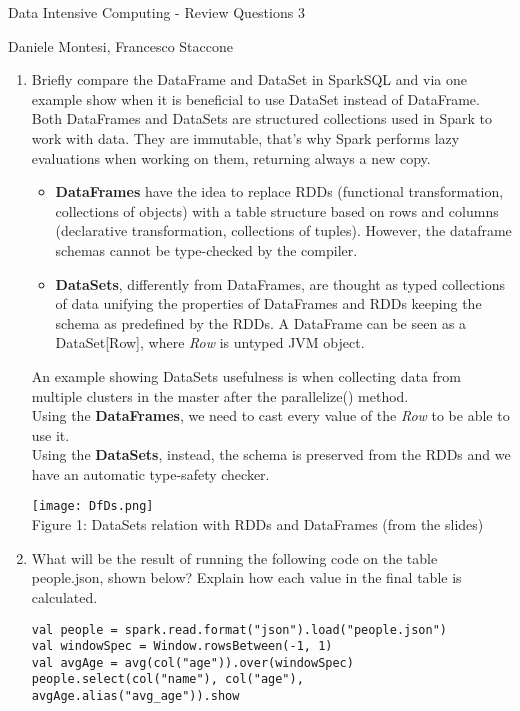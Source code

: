 \documentclass[]{report}
\begin{document}
\begin{center}
 {\Large Data Intensive Computing - Review Questions 3}
\end{center}
\begin{center}
 {\small Daniele Montesi, Francesco Staccone}
\end{center}
\vspace{1cm}
\justify
\begin{enumerate}
 \item Briefly compare the DataFrame and DataSet in SparkSQL and via one example show when it is beneficial to use DataSet instead of DataFrame.\\
 
\noindent Both DataFrames and DataSets are structured collections used in Spark to work with data. They are immutable, that's why Spark performs lazy evaluations when working on them, returning always a new copy.

\begin{itemize}
    \item \textbf{DataFrames} have the idea to replace RDDs (functional transformation, collections of objects) with a table structure based on rows and columns (declarative transformation, collections of tuples).
    However, the dataframe schemas cannot be type-checked by the compiler.
    \item \textbf{DataSets}, differently from DataFrames, are thought as typed collections of data unifying the properties of DataFrames and RDDs keeping the schema as predefined by the RDDs. 
    A DataFrame can be seen as a DataSet[Row], where \textit{Row} is untyped JVM object.
\end{itemize}{}
An example showing DataSets usefulness is when collecting data from multiple clusters in the master after the parallelize() method.\\ Using the \textbf{DataFrames}, we need to cast every value of the \textit{Row} to be able to use it. \\Using the \textbf{DataSets}, instead, the schema is preserved from the RDDs and we have an automatic type-safety checker. 

\begin{center}
  \texttt{[image: DfDs.png]}\\
  Figure 1: DataSets relation with RDDs and DataFrames (from the slides)
\end{center}

 
 
 \item What will be the result of running the following code on the table people.json, shown below? Explain how each value in the final table is calculated.
 \begin{verbatim}
val people = spark.read.format("json").load("people.json")
val windowSpec = Window.rowsBetween(-1, 1)
val avgAge = avg(col("age")).over(windowSpec)
people.select(col("name"), col("age"), avgAge.alias("avg_age")).show


\end{verbatim}
\end{enumerate}
\end{document}
